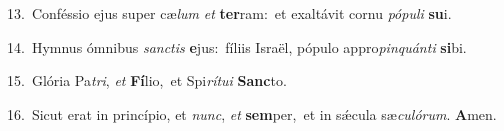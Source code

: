 {\numbfont\textcolor{\numbcolor}{13.}}~Conféssio ejus super cæ\textit{lum} \textit{et} \textbf{ter}\-ram:~\star et exaltávit cornu \textit{pó}\-\textit{pu}\textit{li} \textbf{su}\-i.\par
{\numbfont\textcolor{\numbcolor}{14.}}~Hymnus ómnibus \textit{sanc}\-\textit{tis} \textbf{e}\-jus:~\star fíliis Israël, pópulo appro\-\textit{pin}\-\textit{quán}\textit{ti} \textbf{si}\-bi.\par
{\numbfont\textcolor{\numbcolor}{15.}}~Glória Pa\-\textit{tri}\-, \textit{et} \textbf{Fí}\-lio,~\star et Spi\-\textit{rí}\-\textit{tu}\textit{i} \textbf{Sanc}\-to.\par
{\numbfont\textcolor{\numbcolor}{16.}}~Sicut erat in princípio, et \textit{nunc}\-, \textit{et} \textbf{sem}\-per,~\star et in sǽcula sæ\-\textit{cu}\-\textit{ló}\textit{rum}. \textbf{A}\-men.\par

